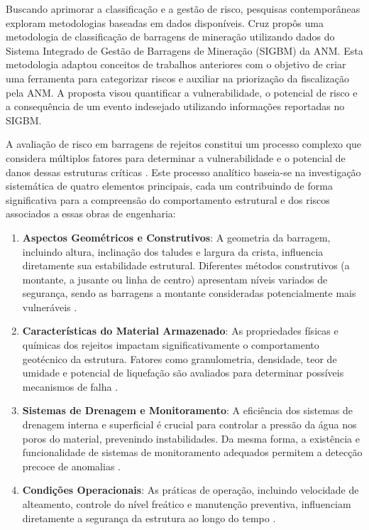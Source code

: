 Buscando aprimorar a classificação e a gestão de risco, pesquisas contemporâneas exploram metodologias baseadas em dados disponíveis. Cruz \cite{cruz2024} propôs uma metodologia de classificação de barragens de mineração utilizando dados do Sistema Integrado de Gestão de Barragens de Mineração (SIGBM) da ANM. Esta metodologia adaptou conceitos de trabalhos anteriores com o objetivo de criar uma ferramenta para categorizar riscos e auxiliar na priorização da fiscalização pela ANM. A proposta visou quantificar a vulnerabilidade, o potencial de risco e a consequência de um evento indesejado utilizando informações reportadas no SIGBM.

A avaliação de risco em barragens de rejeitos constitui um processo complexo que considera múltiplos fatores para determinar a vulnerabilidade e o potencial de danos dessas estruturas críticas \cite{cruz2024}. Este processo analítico baseia-se na investigação sistemática de quatro elementos principais, cada um contribuindo de forma significativa para a compreensão do comportamento estrutural e dos riscos associados a essas obras de engenharia:

\begin{enumerate}
    \item \textbf{Aspectos Geométricos e Construtivos}: A geometria da barragem, incluindo altura, inclinação dos taludes e largura da crista, influencia diretamente sua estabilidade estrutural. Diferentes métodos construtivos (a montante, a jusante ou linha de centro) apresentam níveis variados de segurança, sendo as barragens a montante consideradas potencialmente mais vulneráveis \cite{cruz2024}.
    \item \textbf{Características do Material Armazenado}: As propriedades físicas e químicas dos rejeitos impactam significativamente o comportamento geotécnico da estrutura. Fatores como granulometria, densidade, teor de umidade e potencial de liquefação são avaliados para determinar possíveis mecanismos de falha \cite{cruz2024}.
    \item \textbf{Sistemas de Drenagem e Monitoramento}: A eficiência dos sistemas de drenagem interna e superficial é crucial para controlar a pressão da água nos poros do material, prevenindo instabilidades. Da mesma forma, a existência e funcionalidade de sistemas de monitoramento adequados permitem a detecção precoce de anomalias \cite{cruz2024}.
    \item \textbf{Condições Operacionais}: As práticas de operação, incluindo velocidade de alteamento, controle do nível freático e manutenção preventiva, influenciam diretamente a segurança da estrutura ao longo do tempo \cite{cruz2024}.
\end{enumerate}

